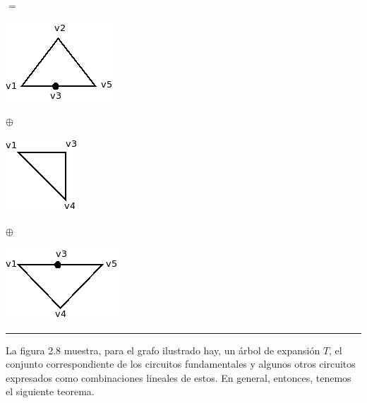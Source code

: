 \documentclass[10pt,a5paper]{book}
\begin{document}
\parbox{2cm}
{
\hspace*{.45in}$=$
}
\parbox{2cm}
{
\includegraphics[scale=.6]{Fig2_8_11.png}
}
\hspace*{.1in}\parbox{1cm}
{
$\oplus$
}
\parbox{2cm}
{
\includegraphics[scale=.6]{Fig2_8_12.png}
}
\parbox{1cm}
{
$\oplus$
}
\hspace*{-.25in}\parbox{2cm}
{
\includegraphics[scale=.6]{Fig2_8_13.png}
}\hrule
\hfill
\nopagebreak

La figura 2.8 muestra, para el grafo ilustrado hay, un árbol de expansión $T$, el conjunto correspondiente de los circuitos fundamentales y algunos otros circuitos expresados como combinaciones lineales de estos. En general, entonces, tenemos el siguiente teorema.
\end{document}
